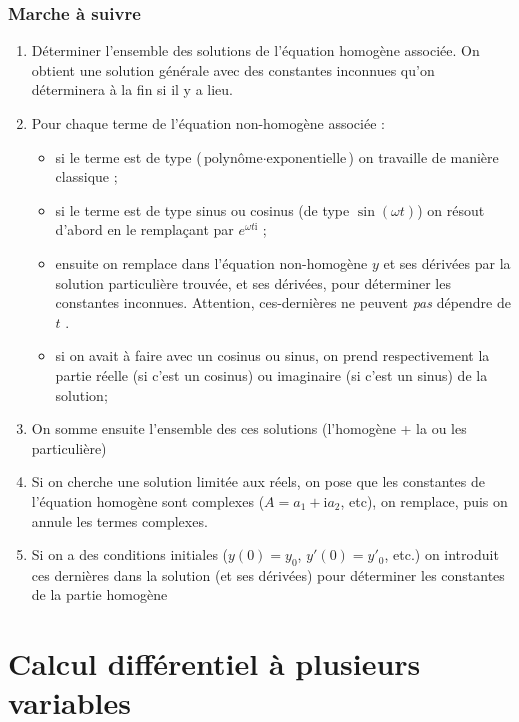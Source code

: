 \documentclass[11pt,a4paper]{article}
\theoremstyle{definition}
\renewcommand{\i}{\mathrm{i}}
\begin{document}
\section{Marche à suivre}

\begin{enumerate}

\item Déterminer l'ensemble des solutions de l'équation homogène associée. On obtient une solution générale avec des constantes inconnues qu'on déterminera à la fin si il y a lieu.
\item Pour chaque terme de l'équation non-homogène associée :
	\begin{itemize}
	\item si le terme est de type ($\text{polynôme} \cdot \text{exponentielle}$) on travaille de manière classique ;
	\item si le terme est de type sinus ou cosinus (de type $\sin (\omega t)$) on résout d'abord en le remplaçant par $e^{\omega t \i}$ ;
	\item ensuite on remplace dans l'équation non-homogène $y$ et ses dérivées par la solution particulière trouvée, et ses dérivées, pour déterminer les constantes inconnues. Attention, ces-dernières ne peuvent \emph{pas} dépendre de $t$ .
	\item si on avait à faire avec un cosinus ou sinus, on prend respectivement la partie réelle (si c'est un cosinus) ou imaginaire (si c'est un sinus) de la solution;
	\end{itemize}
\item On somme ensuite l'ensemble des ces solutions (l'homogène + la ou les particulière)
\item Si on cherche une solution limitée aux réels, on pose que les constantes de l'équation homogène sont complexes ($A = a_1 + \i a_2$, etc), on remplace, puis on annule les termes complexes.
\item Si on a des conditions initiales ($y(0) = y_0$, $y'(0) = y'_0$, etc.) on introduit ces dernières dans la solution (et ses dérivées) pour déterminer les constantes de la partie homogène
\end{enumerate}



\part{Calcul différentiel à plusieurs variables}
\end{document}
